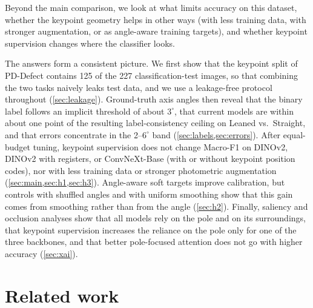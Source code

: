 \documentclass[11pt]{article}
\begin{document}
Beyond the main comparison, we look at what limits accuracy on this dataset, whether the keypoint geometry
helps in other ways (with less training data, with stronger augmentation, or as angle-aware training
targets), and whether keypoint supervision changes where the classifier looks.

The answers form a consistent picture. We first show that the keypoint split of PD-Defect contains 125 of the
227 classification-test images, so that combining the two tasks naively leaks test data, and we use a
leakage-free protocol throughout (\cref{sec:leakage}). Ground-truth axis angles then reveal that the binary
label follows an implicit threshold of about $3^\circ$, that current models are within about one point of the
resulting label-consistency ceiling on Leaned vs.\ Straight, and that errors concentrate in the 2--$6^\circ$
band (\cref{sec:labels,sec:errors}). After equal-budget tuning, keypoint supervision does not change Macro-F1
on DINOv2, DINOv2 with registers, or ConvNeXt-Base (with or without keypoint position codes), nor with less training data or stronger photometric augmentation
(\cref{sec:main,sec:h1,sec:h3}). Angle-aware soft targets improve calibration, but controls with shuffled
angles and with uniform smoothing show that this gain comes from smoothing rather than from the angle
(\cref{sec:h2}). Finally, saliency and occlusion analyses show that all models rely on the pole and on its
surroundings, that keypoint supervision increases the reliance on the pole only for one of the three backbones,
and that better pole-focused attention does not go with higher accuracy (\cref{sec:xai}).

\section{Related work}
\label{sec:related}
\end{document}
